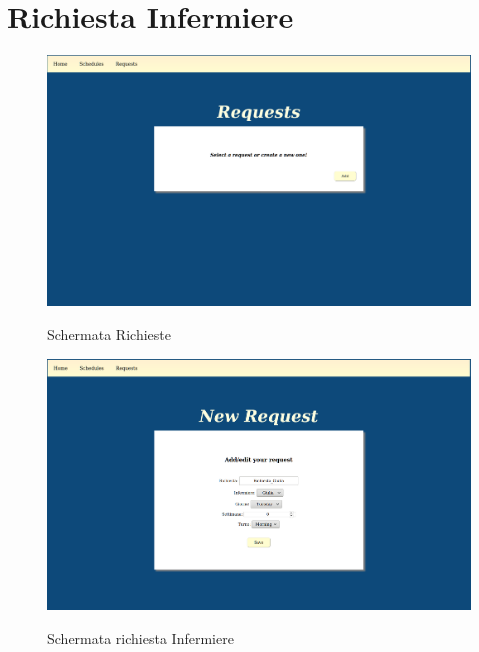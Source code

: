 \section{Richiesta Infermiere}
\begin{figure}[H]
\begin{center}
  \includegraphics[scale=0.20]{img/Schermate/S3.png}\\
  \caption{Schermata Richieste}
\end{center}
\end{figure}

\begin{figure}[H]
\begin{center}
  \includegraphics[scale=0.20]{img/Schermate/S4.png}\\
  \caption{Schermata richiesta Infermiere}
\end{center}
\end{figure}

